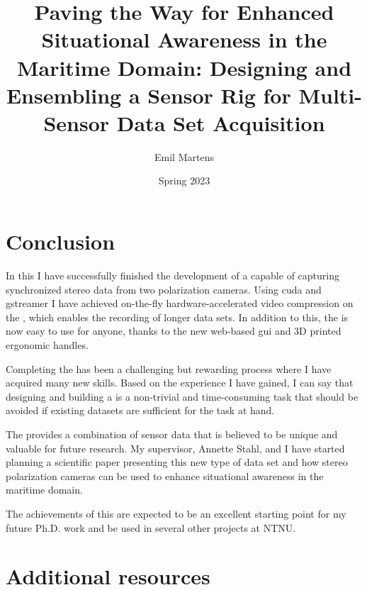 \documentclass[british,titlepage,twoside]{ntnuthesis}
\title{Paving the Way for Enhanced Situational Awareness in the Maritime Domain: 
Designing and Ensembling a Sensor Rig for Multi-Sensor Data Set Acquisition}
\author{Emil Martens}
\date{Spring 2023}
\begin{document}

\tableofcontents
\pagebreak


\chapter{Conclusion}
In this \master I have successfully finished the development of a \sr capable of capturing synchronized stereo data from two polarization cameras.
Using \gls{cuda} and \gls{gstreamer} I have achieved on-the-fly hardware-accelerated video compression on the \jx, which enables the recording of longer data sets.
In addition to this, the \sr is now easy to use for anyone, thanks to the new web-based \gls{gui} and 3D printed ergonomic handles.

Completing the \sr has been a challenging but rewarding process where I have acquired many new skills.
Based on the experience I have gained, I can say that designing and building a \sr is a non-trivial and time-consuming task that should be avoided if existing datasets are sufficient for the task at hand.

The \sr provides a combination of sensor data that is believed to be unique and valuable for future research.
My supervisor, Annette Stahl, and I have started planning a scientific paper presenting this new type of data set and how stereo polarization cameras can be used to enhance situational awareness in the maritime domain.

The achievements of this \master are expected to be an excellent starting point for my future Ph.D. work and be used in several other projects at NTNU.




\printglossary[style=mystyle,type=\acronymtype]
\printglossary[style=mystyle]
\AtNextBibliography{\footnotesize}
\printbibliography

\chapter{Additional resources}
\label{chap:additional_resources}


% 

\end{document}
